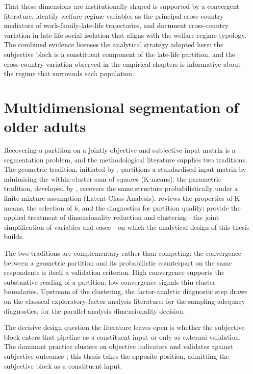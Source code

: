 That these dimensions are institutionally shaped is supported by a convergent literature. \citet{wahrendorfsiegrist2010} identify welfare-regime variables as the principal cross-country mediators of work-family-late-life trajectories, and \citet{courtin2017} document cross-country variation in late-life social isolation that aligns with the welfare-regime typology. The combined evidence licenses the analytical strategy adopted here: the subjective block is a constituent component of the late-life partition, and the cross-country variation observed in the empirical chapters is informative about the regime that surrounds each population.

\section{Multidimensional segmentation of older adults}
\label{sec:ch2-segmentation}

Recovering a partition on a jointly objective-and-subjective input matrix is a segmentation problem, and the methodological literature supplies two traditions. The geometric tradition, initiated by \citet{macqueen1967}, partitions a standardised input matrix by minimising the within-cluster sum of squares (K-means); the parametric tradition, developed by \citet{vermuntmagidson2002}, recovers the same structure probabilistically under a finite-mixture assumption (Latent Class Analysis). \citet{steinley2006} reviews the properties of K-means, the selection of $k$, and the diagnostics for partition quality; \citet{piccarreta2025} provide the applied treatment of dimensionality reduction and clustering---the joint simplification of variables and cases---on which the analytical design of this thesis builds.

The two traditions are complementary rather than competing: the convergence between a geometric partition and its probabilistic counterpart on the same respondents is itself a validation criterion. High convergence supports the substantive reading of a partition; low convergence signals thin cluster boundaries. Upstream of the clustering, the factor-analytic diagnostic step draws on the classical exploratory-factor-analysis literature: \citet{kaiser1974} for the sampling-adequacy diagnostics, \citet{horn1965} for the parallel-analysis dimensionality decision.

The decisive design question the literature leaves open is whether the subjective block enters that pipeline as a constituent input or only as external validation. The dominant practice clusters on objective indicators and validates against subjective outcomes \citep{wahrendorfsiegrist2010}; this thesis takes the opposite position, admitting the subjective block as a constituent input.

